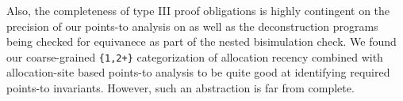 Also, the completeness of type III proof obligations is highly contingent on the precision
of our points-to analysis on \cprog{} as well as the deconstruction programs being
checked for equivanece as part of the nested bisimulation check.
We found our coarse-grained {\tt \{1,2+\}} categorization of allocation recency
combined with allocation-site based points-to analysis to be quite good at
identifying required points-to invariants.
However, such an abstraction is far from complete.